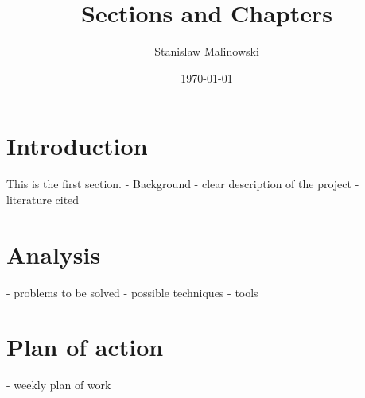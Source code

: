 \documentclass{article}
\title{Sections and Chapters}
\author{Stanislaw Malinowski}
\date{\today}
\begin{document}
\maketitle
\section{Introduction}

This is the first section.
- Background
- clear description of the project
- literature cited

\blindtext

\section{Analysis}
- problems  to be solved
- possible techniques
- tools

\section{Plan of action}
- weekly plan of work
\blindtext
\end{document}
